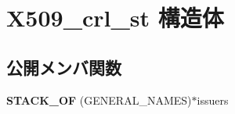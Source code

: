 \hypertarget{struct_x509__crl__st}{}\section{X509\+\_\+crl\+\_\+st 構造体}
\label{struct_x509__crl__st}
\subsection*{公開メンバ関数}
\begin{DoxyCompactItemize}
\item 
\hypertarget{struct_x509__crl__st_acdcd00699fcec46bbb679c40f93629b9}{}{\bfseries S\+T\+A\+C\+K\+\_\+\+O\+F} (G\+E\+N\+E\+R\+A\+L\+\_\+\+N\+A\+M\+E\+S)$\ast$issuers\label{struct_x509__crl__st_acdcd00699fcec46bbb679c40f93629b9}

\end{DoxyCompactItemize}
